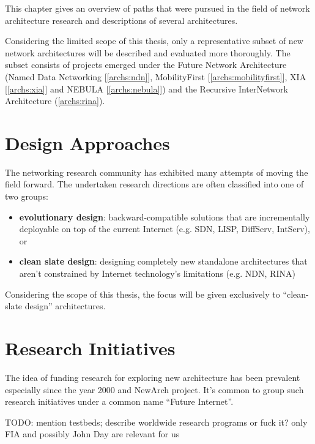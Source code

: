     This chapter gives an overview of paths that were pursued in the field of network architecture research and descriptions of several architectures.

    Considering the limited scope of this thesis, only a representative subset of new network architectures will be described and evaluated more thoroughly. The subset consists of projects emerged under the Future Network Architecture (Named Data Networking [\ref{archs:ndn}], MobilityFirst [\ref{archs:mobilityfirst}], XIA [\ref{archs:xia}] and NEBULA [\ref{archs:nebula}]) and the Recursive InterNetwork Architecture (\ref{archs:rina}).

    \section{Design Approaches}

        The networking research community has exhibited many attempts of moving the field forward. The undertaken research directions are often classified into one of two groups:

        \begin{itemize}
            \item \textbf{evolutionary design}: backward-compatible solutions that are incrementally deployable on top of the current Internet (e.g. SDN, LISP, DiffServ, IntServ), or
            \item \textbf{clean slate design}: designing completely new standalone architectures that aren't constrained by Internet technology's limitations (e.g. NDN, RINA)
        \end{itemize}

        Considering the scope of this thesis, the focus will be given exclusively to ``clean-slate design'' architectures.

    \section{Research Initiatives}

        The idea of funding research for exploring new architecture has been prevalent especially since the year 2000 and NewArch project. It's common to group such research initiatives under a common name ``Future Internet''.

        TODO: mention testbeds; describe worldwide research programs or fuck it? only FIA and possibly John Day are relevant for us

